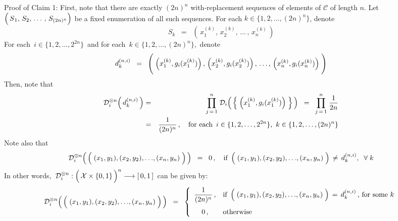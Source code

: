 \vskip 1.0cm
\noindent
Proof of Claim 1:\quad
First, note that there are exactly $(2n)^{n}$ with-replacement sequences of elements of $\mathcal{C}$
of length $n$.
Let $\left(\,\overset{{\color{white}.}}{S}_{1},\,S_{2},\,\ldots\,,\,S_{(2n)^{n}}\right)$ be a fixed enumeration
of all such sequences.
For each $k \in \{1, 2, \ldots, (2n)^{n}\}$, denote
\begin{equation*}
S_{k}
\;\; = \;\;
	\left(\, x^{(k)}_{1} ,\, x^{(k)}_{2} ,\, \ldots\, ,\, x^{(k)}_{n} \,\right)
\end{equation*}
For each \,$i \in\{1, 2, \ldots, 2^{2n}\}$\, and for each \,$k \in \{1, 2, \ldots, (2n)^{n}\}$,\, denote
\begin{equation*}
d^{(n,i)}_{k}
\;\; = \;\;
	\left(\;
		\left(x^{(k)}_{1},g_{i}(x^{(k)}_{1})\right) ,\,
		\left(x^{(k)}_{2},g_{i}(x^{(k)}_{2})\right) ,\,
		\overset{{\color{white}\textnormal{\Large$\vert$}}}{\ldots}\,,\,
		\left(x^{(k)}_{n},g_{i}(x^{(k)}_{n})\right)
	\;\right)
\end{equation*}
Then, note that
\begin{eqnarray*}
\mathcal{D}_{i}^{\otimes n}\!\left(\,d^{(n,i)}_{k}\,\right)
& = &
	\overset{n}{\underset{j\,=\,1}{\prod}}\;
	\mathcal{D}_{i}\!\left(\,\left\{\;\left(x^{(k)}_{1},g_{i}(x^{(k)}_{1})\right)\;\right\}\,\right)
\;\; = \;\;
	\overset{n}{\underset{j\,=\,1}{\prod}}\; \dfrac{1}{2n}
\\
& = &
	\dfrac{1}{(2n)^{n}}\,,
	\quad
	\textnormal{for each \,$i \in\{1, 2, \ldots, 2^{2n}\}$,\, $k \in \{1, 2, \ldots, (2n)^{n}\}$}
\end{eqnarray*}
Note also that
\begin{equation*}
\mathcal{D}_{i}^{\otimes n}\!\left(\,\left(\;(x_{1},y_{1}),(x_{2},y_{2}),\overset{{\color{white}\vert}}{\ldots},(x_{n},y_{n})\;\right)\,\right)
\;\; = \;\; 0\,,
\quad
\textnormal{if \,$\left(\;(x_{1},y_{1}),(x_{2},y_{2}),\overset{{\color{white}\vert}}{\ldots},(x_{n},y_{n})\;\right) \,\neq\, d^{(n,i)}_{k},
\;\;\forall\; k$}
\end{equation*}
In other words,
\,$\mathcal{D}^{\otimes n}_{i} : \left(\,\mathcal{X} \overset{{\color{white}.}}{\times} \{0,1\}\,\right)^{n} \longrightarrow [\,0,1\,]$\,
can be given by:
\begin{equation*}
\mathcal{D}_{i}^{\otimes n}\!\left(\,\left(\;(x_{1},y_{1}),(x_{2},y_{2}),\overset{{\color{white}\vert}}{\ldots},(x_{n},y_{n})\;\right)\,\right)
\;\; = \;\;
	\left\{\begin{array}{cl}
	\dfrac{1}{(2n)^{n}}\,, & \textnormal{if \,$\left(\;(x_{1},y_{1}),(x_{2},y_{2}),\overset{{\color{white}\vert}}{\ldots},(x_{n},y_{n})\;\right)\,=\, d^{(n,i)}_{k}$\,, for some $k$}
	\\
	\overset{{\color{white}\vert}}{0}\,, & \textnormal{otherwise}
	\end{array}\right.
\end{equation*}
